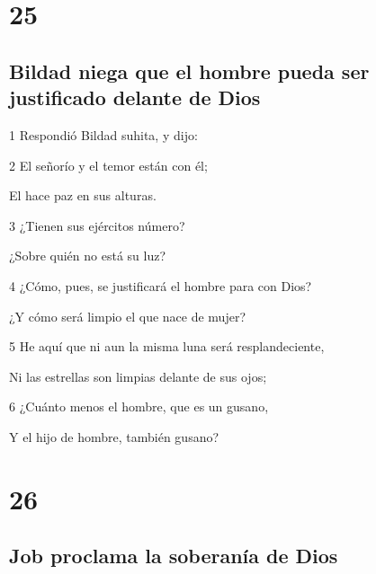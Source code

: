 \chapter{25}

\section*{Bildad niega que el hombre pueda ser justificado delante de Dios}

\par 1 Respondió Bildad suhita, y dijo:
\par 2 El señorío y el temor están con él;
\par El hace paz en sus alturas.
\par 3 ¿Tienen sus ejércitos número?
\par ¿Sobre quién no está su luz?
\par 4 ¿Cómo, pues, se justificará el hombre para con Dios?
\par ¿Y cómo será limpio el que nace de mujer?
\par 5 He aquí que ni aun la misma luna será resplandeciente,
\par Ni las estrellas son limpias delante de sus ojos; 
\par 6 ¿Cuánto menos el hombre, que es un gusano,
\par Y el hijo de hombre, también gusano?

\chapter{26}

\section*{Job proclama la soberanía de Dios}

